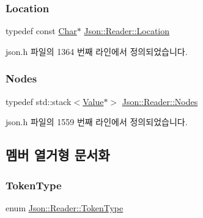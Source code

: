 \subsubsection{\texorpdfstring{Location}{Location}}
{\footnotesize\ttfamily typedef const \hyperlink{class_json_1_1_reader_a3eec9118f3e9a672ba8348c3a79d0f45}{Char}$\ast$ \hyperlink{class_json_1_1_reader_a46795b5b272bf79a7730e406cb96375a}{Json\+::\+Reader\+::\+Location}}



json.\+h 파일의 1364 번째 라인에서 정의되었습니다.

\mbox{\label{class_json_1_1_reader_a8da2114fe8b8124d41ea2f3434f0171b}} 
\subsubsection{\texorpdfstring{Nodes}{Nodes}}
{\footnotesize\ttfamily typedef std\+::stack$<$\hyperlink{class_json_1_1_value}{Value}$\ast$$>$ \hyperlink{class_json_1_1_reader_a8da2114fe8b8124d41ea2f3434f0171b}{Json\+::\+Reader\+::\+Nodes}\hspace{0.3cm}{\ttfamily [private]}}



json.\+h 파일의 1559 번째 라인에서 정의되었습니다.



\subsection{멤버 열거형 문서화}
\mbox{\label{class_json_1_1_reader_aa35e6ab574dc399a0a645ad98ed66bc9}} 
\subsubsection{\texorpdfstring{Token\+Type}{TokenType}}
{\footnotesize\ttfamily enum \hyperlink{class_json_1_1_reader_aa35e6ab574dc399a0a645ad98ed66bc9}{Json\+::\+Reader\+::\+Token\+Type}\hspace{0.3cm}{\ttfamily [private]}}

